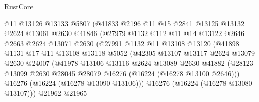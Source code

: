 \begin{lexlean}{RustCore}
\begin{coremodule}
                          @11
                          @13126
                          @13133
                          @5807
                          (@41833
                            @2196
                            @11
                            @15
                            @2841
                            @13125
                            @13132
                            @2624
                            @13061
                            @2630
                            @41846
                            (@27979
                              @1132
                              @112
                              @11
                              @14
                              @13122
                              @2646
                              @2663
                              @2624
                              @13071
                              @2630
                              (@27991
                                @1132
                                @11
                                @13108
                                @13120
                                (@41898
                                  @1131
                                  @17
                                  @11
                                  @13108
                                  @13118
                                  @5052
                                  (@42305
                                    @13107
                                    @13117
                                    @2624
                                    @13079
                                    @2630
                                    @24007
                                    (@41978
                                      @13106
                                      @13116
                                      @2624
                                      @13089
                                      @2630
                                      @41882
                                      (@28123
                                        @13099
                                        @2630
                                        @28045
                                        @28079
                                        @16276
                                        (@16224 (@16278 @13100 @2646)))
                                      @16276
                                      (@16224 (@16278 @13090 @13106)))
                                    @16276
                                    (@16224 (@16278 @13080 @13107)))
                                  @21962
                                  @21965

\end{coremodule}
\end{lexlean}
